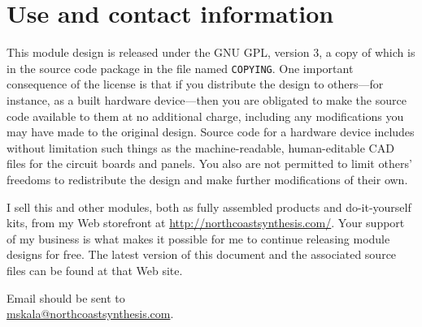 \section{Use and contact information}

This module design is released under the GNU GPL, version 3, a copy of which
is in the source code package in the file named \texttt{COPYING}.  One
important consequence of the license is that if you distribute the design to
others---for instance, as a built hardware device---then you are obligated
to make the source code available to them at no additional charge, including
any modifications you may have made to the original design.  Source code for
a hardware device includes without limitation such things as the
machine-readable, human-editable CAD files for the circuit boards and
panels.  You also are not permitted to limit others' freedoms to
redistribute the design and make further modifications of their own.

I sell this and other modules, both as fully assembled products and
do-it-yourself kits, from my Web storefront at
\url{http://northcoastsynthesis.com/}.  Your support of my business is what
makes it possible for me to continue releasing module designs for free. 
The latest version of this document and the associated source files can be
found at that Web site.

Email should be sent to\\ \url{mskala@northcoastsynthesis.com}.
